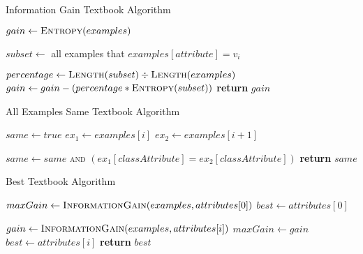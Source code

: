 \begin{algorithm}[H]
\caption{Information Gain Textbook Algorithm}\label{a:id3-gain-simple}
\begin{algorithmic}[1]
    \State $gain \gets \textsc{Entropy}(examples)$
    
        \State $subset \gets$ all examples that $examples[attribute] = v_i$
        
        \State $percentage \gets \textsc{Length}(subset) \div \textsc{Length}(examples)$
            \State $gain \gets gain - (percentage * \textsc{Entropy}(subset))$
        \EndIf
    \EndFor
    \State \textbf{return} $gain$
\EndProcedure
\end{algorithmic}
\end{algorithm}


\begin{algorithm}[H]
\caption{All Examples Same Textbook Algorithm}\label{a:id3-same-simple}
\begin{algorithmic}[1]
    \State $same \gets true$
        \State $ex_1 \gets examples[i]$
        \State $ex_2 \gets examples[i+1]$
        
        \State $same \gets same$ \textsc{and} $(ex_1[classAttribute] = ex_2[classAttribute])$
    \EndFor
    \State \textbf{return} $same$
\EndProcedure
\end{algorithmic}
\end{algorithm}


\begin{algorithm}[H]
\caption{Best Textbook Algorithm}\label{a:id3-best-simple}
\begin{algorithmic}[1]
    \State $maxGain \gets \textsc{InformationGain}(examples, attributes[0])$
    \State $best \gets attributes[0]$
    
        \State $gain \gets  \textsc{InformationGain}(examples, attributes[i])$
            \State $maxGain \gets gain$
            \State $best \gets attributes[i]$
        \EndIf
    \EndFor
    \State \textbf{return} $best$
\EndProcedure

\end{algorithmic}
\end{algorithm}

